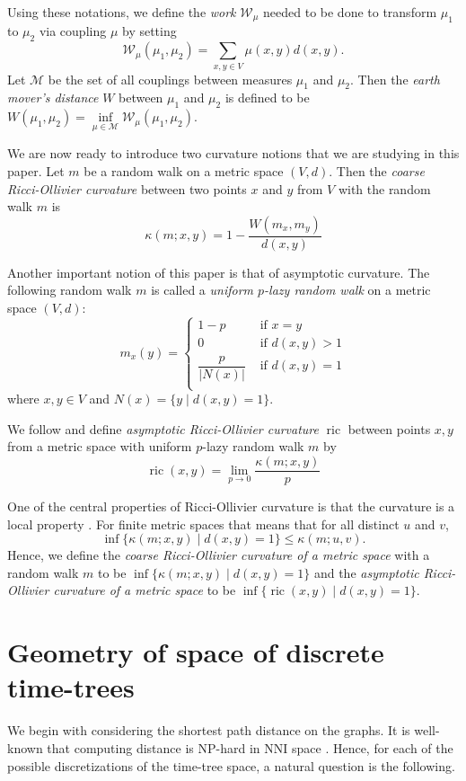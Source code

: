 \documentclass{amsart}
\theoremstyle{definition}
\newcommand{\nni}{\mathrm{NNI}}
\newcommand{\ric}{\operatorname{ric}}
\newcommand{\W}{\mathcal{W}}
\newcommand{\M}{\mathcal{M}}
\begin{document}
Using these notations, we define the {\em work} $\W_\mu$ needed to be done to transform $\mu_1$ to $\mu_2$ via coupling $\mu$ by setting
\[
\W_\mu(\mu_1,\mu_2) = \sum\limits_{x,y\in V}\mu(x,y) d(x,y).
\]
Let $\M$ be the set of all couplings between measures $\mu_1$ and $\mu_2$.
Then the {\em earth mover's distance} $W$ between $\mu_1$ and $\mu_2$ is defined to be $W(\mu_1,\mu_2) = \inf\limits_{\mu\in\M}\W_\mu(\mu_1,\mu_2)$.

We are now ready to introduce two curvature notions that we are studying in this paper.
Let $m$ be a random walk on a metric space $(V,d)$.
Then the {\em coarse Ricci-Ollivier curvature} between two points $x$ and $y$ from $V$ with the random walk $m$ is
\[
\kappa(m;x,y) = 1 - \frac{W(m_x,m_y)}{d(x,y)}
\]

Another important notion of this paper is that of asymptotic curvature.
The following random walk $m$ is called a {\em uniform $p$-lazy random walk} on a metric space $(V,d)$:
\[
m_x(y) =
\begin{cases}
1-p			& \mbox{ if } x=y \\
0   			& \mbox{ if } d(x,y) > 1 \\
\dfrac{p}{|N(x)|}	& \mbox{ if } d(x,y) = 1 \\
\end{cases}
\]
where $x,y \in V$ and $N(x) = \{y \mid d(x,y) = 1\}$.

We follow \textcite{Loisel2014-gu} and define {\em asymptotic Ricci-Ollivier curvature} $\ric$ between points $x,y$ from a metric space with uniform $p$-lazy random walk $m$ by
\[
\ric(x,y) = \lim_{p\to0} \frac{\kappa(m;x,y)}{p}
\]

One of the central properties of Ricci-Ollivier curvature is that the curvature is a local property \autocite{Ollivier2009-cj}.
For finite metric spaces that means that for all distinct $u$ and $v$,
\[
\inf\{\kappa(m;x,y)\mid d(x,y) = 1\} \leq \kappa(m;u,v).
\]
Hence, we define the {\em coarse Ricci-Ollivier curvature of a metric space} with a random walk $m$ to be $\inf\{\kappa(m;x,y)\mid d(x,y) = 1\}$ and the {\em asymptotic Ricci-Ollivier curvature of a metric space} to be $\inf\{\ric(x,y)\mid d(x,y) = 1\}$.


\section{Geometry of space of discrete time-trees}

We begin with considering the shortest path distance on the graphs.
It is well-known that computing distance is NP-hard in $\nni$ space \autocite{Dasgupta2000-xa}.
Hence, for each of the possible discretizations of the time-tree space, a natural question is the following.
\end{document}
